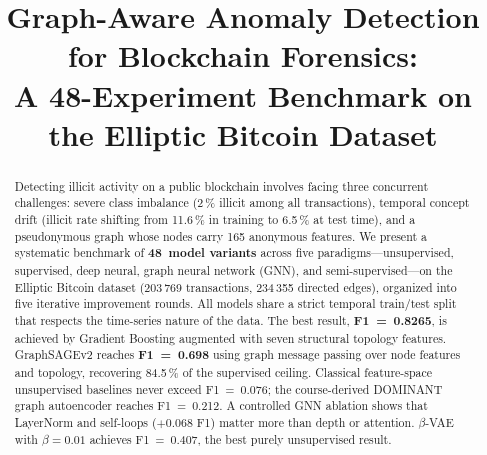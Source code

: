 \documentclass[conference]{IEEEtran}
\begin{document}
\title{Graph-Aware Anomaly Detection for Blockchain Forensics:\\
A 48-Experiment Benchmark on the Elliptic Bitcoin Dataset}

\author{
  \and
}

\maketitle

\begin{abstract}
Detecting illicit activity on a public blockchain involves facing three
concurrent challenges: severe class imbalance (2\,\% illicit among all
transactions), temporal concept drift (illicit rate shifting from 11.6\,\% in
training to 6.5\,\% at test time), and a pseudonymous graph whose nodes carry
165 anonymous features.  We present a systematic benchmark of \textbf{48~model
variants} across five paradigms---unsupervised, supervised, deep neural, graph
neural network (GNN), and semi-supervised---on the Elliptic Bitcoin dataset
(203\,769 transactions, 234\,355 directed edges), organized into five iterative
improvement rounds.  All models share a strict temporal train/test split
that respects the time-series nature of the data.  The best result,
\textbf{F1~=~0.8265}, is achieved by Gradient Boosting augmented with seven
structural topology features.  GraphSAGEv2 reaches \textbf{F1~=~0.698} using
graph message passing over node features and topology, recovering 84.5\,\% of
the supervised ceiling.  Classical feature-space unsupervised baselines never
exceed F1~=~0.076; the course-derived DOMINANT graph autoencoder reaches
F1~=~0.212.  A controlled GNN ablation shows that
LayerNorm and self-loops ($+0.068$ F1) matter more than depth or attention.
$\beta$-VAE with $\beta{=}0.01$ achieves F1~=~0.407, the best purely
unsupervised result.
\end{abstract}
\end{document}
